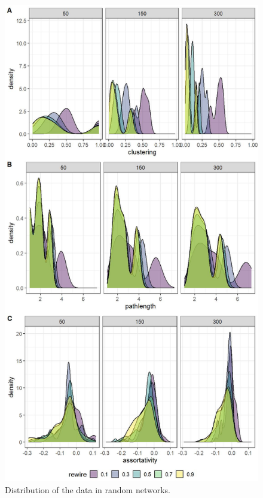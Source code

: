 \documentclass[
]{article}
\begin{document}
\begin{figure}[!H]

{\centering \includegraphics{./Figures/unnamed-chunk-73-1} 

}

\caption{Distribution of the data in random networks.}\label{fig:unnamed-chunk-73}
\end{figure}
\end{document}
